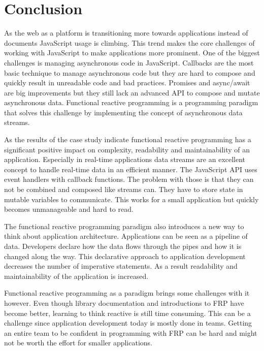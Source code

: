 \chapter*{Conclusion} %
\label{sec:besluit}

As the web as a platform is transitioning more towards applications instead of documents JavaScript usage is climbing. This trend makes the core challenges of working with JavaScript to make applications more prominent. One of the biggest challenges is managing asynchronous code in JavaScript. Callbacks are the most basic technique to manage asynchronous code but they are hard to compose and quickly result in unreadable code and bad practices. Promises and async/await are big improvements but they still lack an advanced API to compose and mutate asynchronous data. Functional reactive programming is a programming paradigm that solves this challenge by implementing the concept of asynchronous data streams.

As the results of the case study indicate functional reactive programming has a significant positive impact on complexity, readability and maintainability of an application. Especially in real-time applications data streams are an excellent concept to handle real-time data in an efficient manner. The JavaScript API uses event handlers with callback functions. The problem with those is that they can not be combined and composed like streams can. They have to store state in mutable variables to communicate. This works for a small application but quickly becomes unmanageable and hard to read.

The functional reactive programming paradigm also introduces a new way to think about application architecture. Applications can be seen as a pipeline of data. Developers declare how the data flows through the pipes and how it is changed along the way. This declarative approach to application development decreases the number of imperative statements. As a result readability and maintainability of the application is increased.

Functional reactive programming as a paradigm brings some challenges with it however. Even though library documentation and introductions to FRP have become better, learning to think reactive is still time consuming. This can be a challenge since application development today is mostly done in teams. Getting an entire team to be confident in programming with FRP can be hard and might not be worth the effort for smaller applications.

